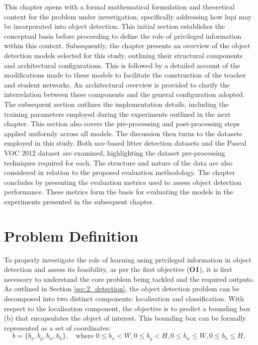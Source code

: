 This chapter opens with a formal mathematical formulation and theoretical context for the problem under investigation, specifically addressing how \gls{lupi} may be incorporated into object detection. This initial section establishes the conceptual basis before proceeding to define the role of privileged information within this context.
Subsequently, the chapter presents an overview of the object detection models selected for this study, outlining their structural components and architectural configurations. This is followed by a detailed account of the modifications made to these models to facilitate the construction of the teacher and student networks. An architectural overview is provided to clarify the interrelation between these components and the general configuration adopted.
The subsequent section outlines the implementation details, including the training parameters employed during the experiments outlined in the next chapter. This section also covers the pre-processing and post-processing steps applied uniformly across all models.
The discussion then turns to the datasets employed in this study. Both \gls{uav}-based litter detection datasets and the Pascal VOC 2012 dataset are examined, highlighting the dataset pre-processing techniques required for each. The structure and nature of the data are also considered in relation to the proposed evaluation methodology.
The chapter concludes by presenting the evaluation metrics used to assess object detection performance. These metrics form the basis for evaluating the models in the experiments presented in the subsequent chapter.

\section{Problem Definition}
\label{sec:4_problem_definition}

To properly investigate the role of learning using privileged information in object detection and assess its feasibility, as per the first objective (\textbf{O1}), it is first necessary to understand the core problem being tackled and the required outputs. As outlined in Section \ref{sec:2_detection}, the object detection problem can be decomposed into two distinct components: localisation and classification.
With respect to the localisation component, the objective is to predict a bounding box (\gls{b}) that encapsulates the object of interest. This bounding box can be formally represented as a set of coordinates:
\begin{equation}
\label{eq:bounding_box}
b = \{b_x, b_y, b_w, b_h\}, \quad \text{where } 0 \leq b_x < W, 0 \leq b_y < H, 0 \leq b_w \leq W, 0 \leq b_h \leq H,
\end{equation}

